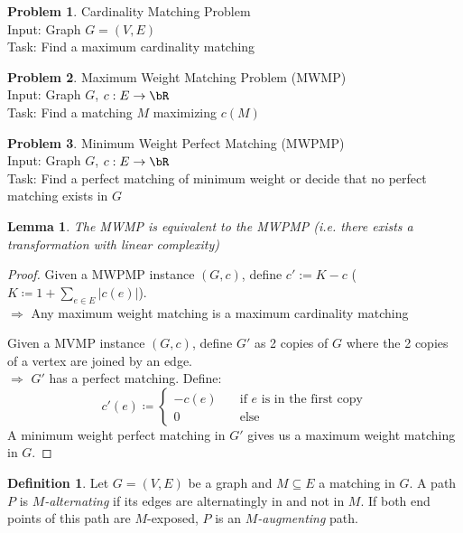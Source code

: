 \documentclass[11pt, a4paper]{article}
\newcommand{\abs}[1]{\left\lvert#1\right\rvert}
\newtheorem{lemma}[theorem]{Lemma}
\theoremstyle{remark}
\theoremstyle{definition}
\newtheorem{definition}[theorem]{Definition}
\newtheorem*{problem}{Problem}
\begin{document}
\begin{problem}{Cardinality Matching Problem}\\
Input: Graph $G=(V,E)$ \\
Task: Find a maximum cardinality matching
\end{problem}

\begin{problem}{Maximum Weight Matching Problem (MWMP)}\\
Input: Graph $G$, $c:E\to \bR$ \\
Task: Find a matching $M$ maximizing $c(M)$
\end{problem}

\begin{problem}{Minimum Weight Perfect Matching (MWPMP)}\\
Input: Graph $G$, $c:E\to\bR$\\
Task: Find a perfect matching of minimum weight or decide that no
perfect matching exists in $G$
\end{problem}

\begin{lemma}
	The MWMP is equivalent to the MWPMP (i.e. there exists a transformation
	with linear complexity)
\end{lemma}
\begin{proof}
	Given a MWPMP instance $(G,c)$, define $c':=K-c$
	($K\coloneqq 1+\sum_{e\in E}\abs{c(e)}$). \\
	$\Rightarrow$ Any maximum weight matching is a maximum cardinality
	matching

	Given a MVMP instance $(G,c)$, define $G'$ as 2 copies of $G$ where
	the 2 copies of a vertex are joined by an edge. \\ $\Rightarrow$ $G'$
	has a perfect matching. Define:
	\[c'(e)\coloneqq \begin{cases}
			-c(e) \quad & \text{if $e$ is in the first copy} \\
			0           & \text{else}
		\end{cases}\]
	A minimum weight perfect matching in $G'$ gives us a maximum weight
	matching in $G$.
\end{proof}

\begin{definition}
	Let $G=(V,E)$ be a graph and $M\subseteq E$ a matching in $G$.
	A path $P$ is \emph{$M$-alternating} if its edges are alternatingly
	in and not in $M$. If both end points of this path are $M$-exposed,
	$P$ is an \emph{$M$-augmenting} path.
\end{definition}
\end{document}
